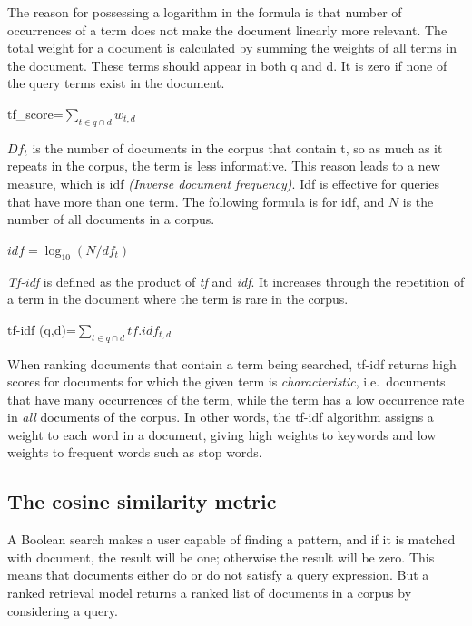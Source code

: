 \documentclass{IOS-Book-Article}
\begin{document}
The reason for possessing a logarithm in the formula is that number of occurrences of a term does not make the document linearly more relevant. The total weight for a document is calculated by summing the weights of all terms in the document. These terms should appear in both q and d. It is zero if none of the query terms exist in the document.

\begin{center}
	tf\_score=$\sum_{t\in q\cap d} w_{t,d}$
\end{center}

$Df_t$ is the number of documents in the corpus that contain t, so as much as it repeats in the corpus, the term is less informative. This reason leads to a new measure, which is idf \emph{(Inverse document frequency)}. Idf is effective for queries that have more than one term. The following formula is for idf, and $N$ is the number of all documents in a corpus.

\begin{center} 
	$idf=\log_{10} (N/df_t)$
\end{center}

\emph{Tf-idf} is defined as the product of \emph{tf} and \emph{idf}. 
It increases through the repetition of a term in the document where the term is rare in the corpus.

\begin{center}
	tf-idf (q,d)=$\sum_{t\in q\cap d} \mathit{tf}.idf_{t,d}$
\end{center}

When ranking documents that contain a term being searched, tf-idf returns high scores for documents for which the given term is \emph{characteristic}, i.e.\ documents that have many occurrences of the term, while the term has a low occurrence rate in \emph{all} documents of the corpus. In other words, the tf-idf algorithm assigns a weight to each word in a document, giving high weights to keywords and low weights to frequent words such as stop words.

\subsection{The cosine similarity metric}
\label{sec:cosine}
A Boolean search makes a user capable of finding a pattern, and if it is matched with document, the result will be one; otherwise the result will be zero. This means that documents either do or do not satisfy a query expression. But a ranked retrieval model returns a ranked list of documents in a corpus by considering a query. 
\end{document}
